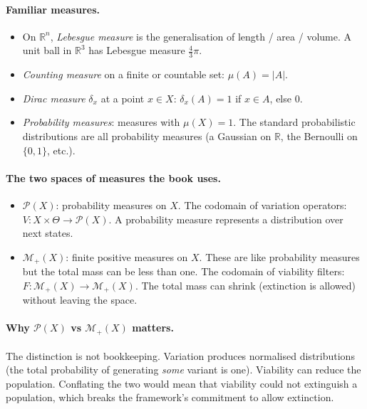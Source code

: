 \paragraph{Familiar measures.}

\begin{itemize}[leftmargin=1.5em,itemsep=2pt]
  \item On $\mathbb{R}^n$, \emph{Lebesgue measure} is the
    generalisation of length / area / volume. A unit ball in
    $\mathbb{R}^3$ has Lebesgue measure $\frac{4}{3}\pi$.
  \item \emph{Counting measure} on a finite or countable set:
    $\mu(A) = |A|$.
  \item \emph{Dirac measure} $\delta_x$ at a point $x \in X$:
    $\delta_x(A) = 1$ if $x \in A$, else $0$.
  \item \emph{Probability measures}: measures with $\mu(X) = 1$. The
    standard probabilistic distributions are all probability
    measures (a Gaussian on $\mathbb{R}$, the Bernoulli on
    $\{0,1\}$, etc.).
\end{itemize}

\paragraph{The two spaces of measures the book uses.}

\begin{itemize}[leftmargin=1.5em,itemsep=2pt]
  \item $\mathcal{P}(X)$: probability measures on $X$. The codomain
    of variation operators: $V : X \times \Theta \to \mathcal{P}(X)$.
    A probability measure represents a distribution over next
    states.
  \item $\mathcal{M}_+(X)$: finite positive measures on $X$. These
    are like probability measures but the total mass can be less
    than one. The codomain of viability filters: $F : \mathcal{M}_+(X)
    \to \mathcal{M}_+(X)$. The total mass can shrink (extinction is
    allowed) without leaving the space.
\end{itemize}

\paragraph{Why $\mathcal{P}(X)$ vs $\mathcal{M}_+(X)$ matters.} The
distinction is not bookkeeping. Variation produces normalised
distributions (the total probability of generating \emph{some}
variant is one). Viability can reduce the population. Conflating the
two would mean that viability could not extinguish a population,
which breaks the framework's commitment to allow extinction.

